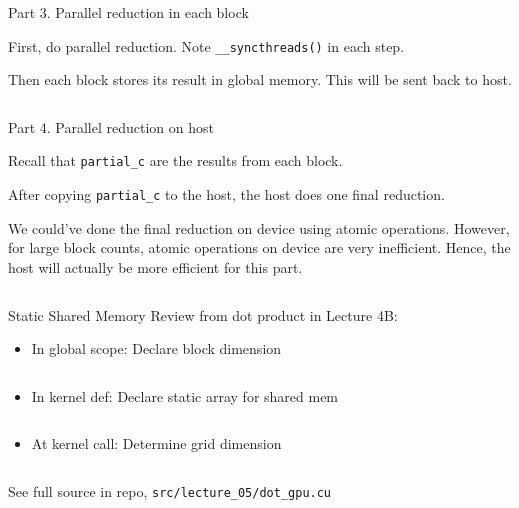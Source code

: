 \documentclass{beamer}
\begin{document}
    \begin{frame}{Part 3. Parallel reduction in each block}
        \begin{itemize}
        {\footnotesize
        \item First, do parallel reduction. Note \texttt{\_\_syncthreads()} in each step.
        \item Then each block stores its result in global memory.  This will be sent back to host.
        }
        \end{itemize}
        \begin{block}{}
            \inputminted[fontsize=\footnotesize]{cuda}{src/dot_snippet_03.cu}
        \end{block}
    \end{frame}

    \begin{frame}{Part 4. Parallel reduction on host}
        \begin{itemize}
        {\footnotesize
        \item Recall that \texttt{partial\_c} are the results from each block.
        \item After copying \texttt{partial\_c} to the host, the host does one final reduction.
        \item We could've done the final reduction on device using atomic operations.
              However, for large block counts, atomic operations on device are very inefficient.
              Hence, the host will actually be more efficient for this part.
        }
        \end{itemize}
        \begin{block}{}
            \inputminted[fontsize=\footnotesize]{cuda}{src/dot_snippet_04.cu}
        \end{block}
    \end{frame}


    \begin{frame}{Static Shared Memory}
        Review from dot product in Lecture 4B:
        \begin{itemize}
            \item In global scope:  Declare block dimension
            \begin{block}{}
                \inputminted{cuda}{src/static_01.cu}
            \end{block}
            \item In kernel def:  Declare static array for shared mem
            \begin{block}{}
                \inputminted{cuda}{src/static_02.cu}
            \end{block}
            \item At kernel call:  Determine grid dimension
            \begin{block}{}
                \inputminted{cuda}{src/static_03.cu}
            \end{block}
        \end{itemize}
        See full source in repo, \texttt{src/lecture\_05/dot\_gpu.cu}
    \end{frame}
\end{document}
